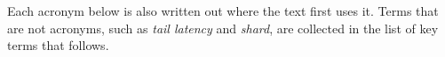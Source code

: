 \documentclass[english,oneside,a4paper,censored,csm,software-track-2020]{HYthesisML}
\begin{document}
{\begin{otherlanguage}{english}
\begin{abstract}
\end{abstract}
\end{otherlanguage}
}

\cleardoublepage
{}
\setcounter{page}{1}
\tableofcontents

\cleardoublepage
{}
{}
\listoffigures

\cleardoublepage
{}
{}
\listoftables

\cleardoublepage
{}
{}
\chapter*{\nomname}
\markboth{\nomname}{\nomname}
\label{page:acronyms}

\noindent Each acronym below is also written out where the text first uses it. Terms that are
not acronyms, such as \emph{tail latency} and \emph{shard}, are collected in
the list of key terms that follows.
\end{document}
